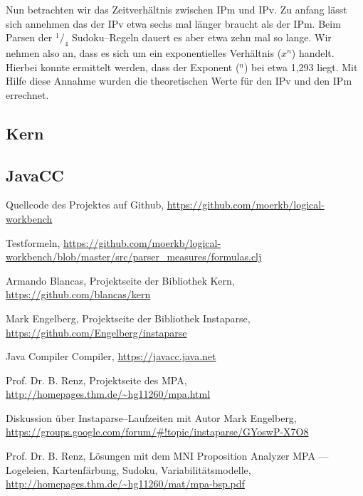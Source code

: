 \documentclass[ngerman,a4paper,abstracton,open=right,twoside=false,toc=listofnumbered,bibtotocnumbered]{scrreprt}
\begin{document}
Nun betrachten wir das Zeitverhältnis zwischen IPm und IPv. Zu anfang lässt sich annehmen das der IPv etwa sechs mal länger braucht als der IPm. Beim Parsen der $^1/_4$ Sudoku--Regeln dauert es aber etwa zehn mal so lange. Wir nehmen also an, dass es sich um ein exponentielles Verhältnis ($x^n$) handelt. Hierbei konnte ermittelt werden, dass der Exponent ($^n$) bei etwa 1,293 liegt. Mit Hilfe diese Annahme wurden die theoretischen Werte für den IPv und den IPm errechnet.

\subsection{Kern}
\subsection{JavaCC}

\appendix

\begin{thebibliography}{7}
		Quellcode des Projektes auf Github, 
		\url{https://github.com/moerkb/logical-workbench}

		Testformeln,
		\url{https://github.com/moerkb/logical-workbench/blob/master/src/parser_measures/formulas.clj}

		Armando Blancas,
		Projektseite der Bibliothek Kern, 
		\url{https://github.com/blancas/kern}

		Mark Engelberg,
		Projektseite der Bibliothek Instaparse,
		\url{https://github.com/Engelberg/instaparse}

		Java Compiler Compiler,
		\url{https://javacc.java.net}

		Prof. Dr. B. Renz,
		Projektseite des MPA,
		\url{http://homepages.thm.de/~hg11260/mpa.html}

		Diskussion über Instaparse--Laufzeiten mit Autor Mark Engelberg, 
		\url{https://groups.google.com/forum/#!topic/instaparse/GYoswP-X7O8}

		Prof. Dr. B. Renz,
		Lösungen mit dem MNI Proposition Analyzer MPA --- Logeleien, Kartenfärbung, Sudoku, Variabilitätsmodelle,
		\url{http://homepages.thm.de/~hg11260/mat/mpa-bsp.pdf}
\end{thebibliography}

\clearpage
\begingroup
\let\clearpage\relax
\listoffigures
\listoftables
\endgroup
\end{document}
